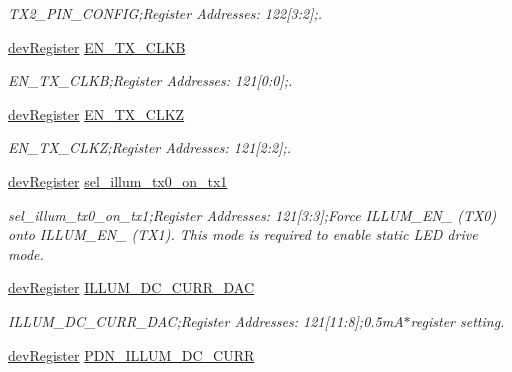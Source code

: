 \begin{DoxyCompactItemize}
\begin{DoxyCompactList}\small\item\em T\+X2\+\_\+\+P\+I\+N\+\_\+\+C\+O\+N\+F\+IG;Register Addresses\+: 122\mbox{[}3\+:2\mbox{]};. \end{DoxyCompactList}\item 
\mbox{\hyperlink{classdev_register}{dev\+Register}} \mbox{\hyperlink{class_o_p_t3101_registers_a5b3861eb87aa23a372866d40141e1d1b}{E\+N\+\_\+\+T\+X\+\_\+\+C\+L\+KB}}
\begin{DoxyCompactList}\small\item\em E\+N\+\_\+\+T\+X\+\_\+\+C\+L\+KB;Register Addresses\+: 121\mbox{[}0\+:0\mbox{]};. \end{DoxyCompactList}\item 
\mbox{\hyperlink{classdev_register}{dev\+Register}} \mbox{\hyperlink{class_o_p_t3101_registers_ae3adb0e788cb2ebb0ced80223fab4358}{E\+N\+\_\+\+T\+X\+\_\+\+C\+L\+KZ}}
\begin{DoxyCompactList}\small\item\em E\+N\+\_\+\+T\+X\+\_\+\+C\+L\+KZ;Register Addresses\+: 121\mbox{[}2\+:2\mbox{]};. \end{DoxyCompactList}\item 
\mbox{\hyperlink{classdev_register}{dev\+Register}} \mbox{\hyperlink{class_o_p_t3101_registers_ae2eb8747ea97079cdb23f696d6cdb16d}{sel\+\_\+illum\+\_\+tx0\+\_\+on\+\_\+tx1}}
\begin{DoxyCompactList}\small\item\em sel\+\_\+illum\+\_\+tx0\+\_\+on\+\_\+tx1;Register Addresses\+: 121\mbox{[}3\+:3\mbox{]};Force I\+L\+L\+U\+M\+\_\+\+E\+N\+\_ (T\+X0) onto I\+L\+L\+U\+M\+\_\+\+E\+N\+\_ (T\+X1). This mode is required to enable static L\+ED drive mode. \end{DoxyCompactList}\item 
\mbox{\hyperlink{classdev_register}{dev\+Register}} \mbox{\hyperlink{class_o_p_t3101_registers_ac87d1ee56176d705921c2a31686a75b9}{I\+L\+L\+U\+M\+\_\+\+D\+C\+\_\+\+C\+U\+R\+R\+\_\+\+D\+AC}}
\begin{DoxyCompactList}\small\item\em I\+L\+L\+U\+M\+\_\+\+D\+C\+\_\+\+C\+U\+R\+R\+\_\+\+D\+AC;Register Addresses\+: 121\mbox{[}11\+:8\mbox{]};0.\+5mA$\ast$register setting. \end{DoxyCompactList}\item 
\mbox{\hyperlink{classdev_register}{dev\+Register}} \mbox{\hyperlink{class_o_p_t3101_registers_af76bc6a5db0e4511c0b3bb200cbc2916}{P\+D\+N\+\_\+\+I\+L\+L\+U\+M\+\_\+\+D\+C\+\_\+\+C\+U\+RR}}

\end{DoxyCompactItemize}
